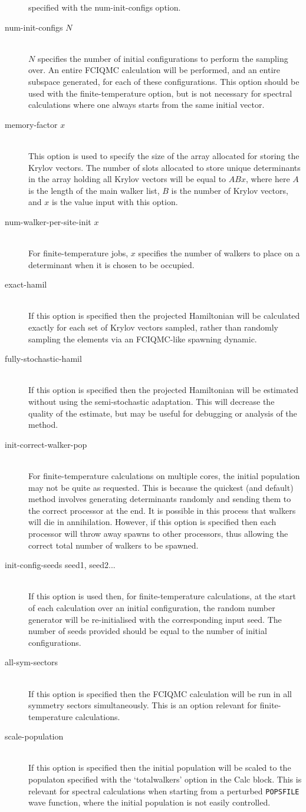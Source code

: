 \documentclass[a4paper,notitlepage,dvipsnames]{scrreprt}
\newcommand\codeitem[1]{\needspace{1.5\baselineskip}\item[\textnormal{\ttfamily #1 \nopagebreak}] \hfill \\ \nopagebreak}
\begin{document}
\begin{description}
    specified with the num-init-configs option.
    \codeitem{num-init-configs $N$}
    $N$ specifies the number of initial configurations to perform the
    sampling over. An entire FCIQMC calculation will be performed, and
    an entire subspace generated, for each of these configurations.
    This option should be used with the finite-temperature option, but
    is not necessary for spectral calculations where one always starts
    from the same initial vector.
    \codeitem{memory-factor $x$}
    This option is used to specify the size of the array allocated for
    storing the Krylov vectors. The number of slots allocated to store
    unique determinants in the array holding all Krylov vectors will be
    equal to $ABx$, where here $A$ is the length of the main walker
    list, $B$ is the number of Krylov vectors, and $x$ is the value input
    with this option.
    \codeitem{num-walker-per-site-init $x$}
    For finite-temperature jobs, $x$ specifies the number of walkers to
    place on a determinant when it is chosen to be occupied.
    \codeitem{exact-hamil}
    If this option is specified then the projected Hamiltonian will
    be calculated exactly for each set of Krylov vectors sampled,
    rather than randomly sampling the elements via an FCIQMC-like
    spawning dynamic.
    \codeitem{fully-stochastic-hamil}
    If this option is specified then the projected Hamiltonian will be
    estimated without using the semi-stochastic adaptation. This will
    decrease the quality of the estimate, but may be useful for
    debugging or analysis of the method.
    \codeitem{init-correct-walker-pop}
    For finite-temperature calculations on multiple cores, the initial
    population may not be quite as requested. This is because the
    quickest (and default) method involves generating determinants
    randomly and sending them to the correct processor at the end. It
    is possible in this process that walkers will die in annihilation.
    However, if this option is specified then each processor will throw
    away spawns to other processors, thus allowing the correct total
    number of walkers to be spawned.
    \codeitem{init-config-seeds seed1, seed2...}
    If this option is used then, for finite-temperature calculations,
    at the start of each calculation over an initial configuration,
    the random number generator will be re-initialised with the
    corresponding input seed. The number of seeds provided should be
    equal to the number of initial configurations.
    \codeitem{all-sym-sectors}
    If this option is specified then the FCIQMC calculation will be
    run in all symmetry sectors simultaneously. This is an option
    relevant for finite-temperature calculations.
    \codeitem{scale-population}
    If this option is specified then the initial population will be
    scaled to the populaton specified with the `totalwalkers' option
    in the Calc block. This is relevant for spectral calculations when
    starting from a perturbed \texttt{POPSFILE} wave function, where the
    initial population is not easily controlled.
  \end{description}
\end{document}
